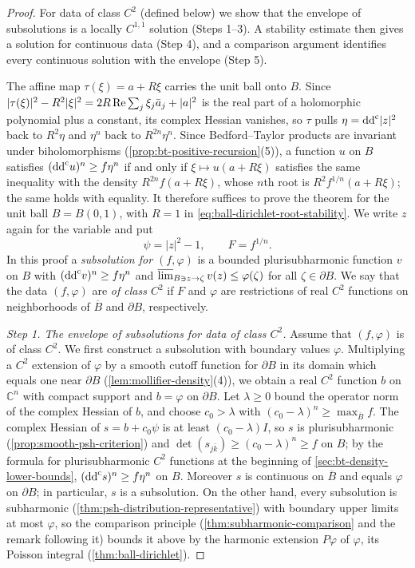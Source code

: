 \begin{proof}
For data of class $C^2$ (defined below) we show that the envelope of subsolutions is a locally $C^{1,1}$ solution (Steps 1--3). A stability estimate then gives a solution for continuous data (Step 4), and a comparison argument identifies every continuous solution with the envelope (Step 5).

The affine map $\tau(\xi)=a+R\xi$ carries the unit ball onto $B$. Since $|\tau(\xi)|^2-R^2|\xi|^2=2R\operatorname{Re}\sum_j\xi_j\bar a_j+|a|^2$ is the real part of a holomorphic polynomial plus a constant, its complex Hessian vanishes, so $\tau$ pulls $\eta=\mathrm{dd}^{\mathrm{c}}|z|^2$ back to $R^2\eta$ and $\eta^n$ back to $R^{2n}\eta^n$. Since Bedford--Taylor products are invariant under biholomorphisms (\cref{prop:bt-positive-recursion}(5)), a function $u$ on $B$ satisfies $(\mathrm{dd}^{\mathrm{c}} u)^n\ge f\eta^n$ if and only if $\xi\mapsto u(a+R\xi)$ satisfies the same inequality with the density $R^{2n}f(a+R\xi)$, whose $n$th root is $R^2f^{1/n}(a+R\xi)$; the same holds with equality. It therefore suffices to prove the theorem for the unit ball $B=B(0,1)$, with $R=1$ in \eqref{eq:ball-dirichlet-root-stability}. We write $z$ again for the variable and put
\[
 \psi=|z|^2-1,\qquad F=f^{1/n}.
\]
In this proof a \emph{subsolution for $(f,\varphi)$} is a bounded plurisubharmonic function $v$ on $B$ with $(\mathrm{dd}^{\mathrm{c}} v)^n\ge f\eta^n$ and $\varlimsup_{B\ni z\to\zeta}v(z)\le\varphi(\zeta)$ for all $\zeta\in\partial B$. We say that the data $(f,\varphi)$ are \emph{of class $C^2$} if $F$ and $\varphi$ are restrictions of real $C^2$ functions on neighborhoods of $\overline B$ and $\partial B$, respectively.

\emph{Step 1. The envelope of subsolutions for data of class $C^2$.}
Assume that $(f,\varphi)$ is of class $C^2$. We first construct a subsolution with boundary values $\varphi$. Multiplying a $C^2$ extension of $\varphi$ by a smooth cutoff function for $\partial B$ in its domain which equals one near $\partial B$ (\cref{lem:mollifier-density}(4)), we obtain a real $C^2$ function $b$ on $\mathbb C^n$ with compact support and $b=\varphi$ on $\partial B$. Let $\lambda\ge0$ bound the operator norm of the complex Hessian of $b$, and choose $c_0>\lambda$ with $(c_0-\lambda)^n\ge\max_{\overline B}f$. The complex Hessian of $s=b+c_0\psi$ is at least $(c_0-\lambda)I$, so $s$ is plurisubharmonic (\cref{prop:smooth-psh-criterion}) and $\det(s_{j\bar k})\ge(c_0-\lambda)^n\ge f$ on $B$; by the formula for plurisubharmonic $C^2$ functions at the beginning of \cref{sec:bt-density-lower-bounds}, $(\mathrm{dd}^{\mathrm{c}} s)^n\ge f\eta^n$ on $B$. Moreover $s$ is continuous on $\overline B$ and equals $\varphi$ on $\partial B$; in particular, $s$ is a subsolution. On the other hand, every subsolution is subharmonic (\cref{thm:psh-distribution-representative}) with boundary upper limits at most $\varphi$, so the comparison principle (\cref{thm:subharmonic-comparison} and the remark following it) bounds it above by the harmonic extension $P\varphi$ of $\varphi$, its Poisson integral (\cref{thm:ball-dirichlet}).


\end{proof}

